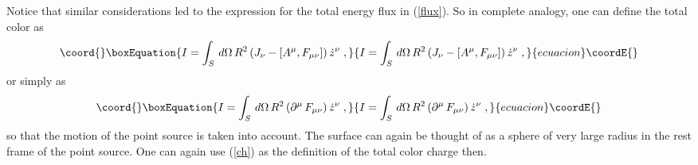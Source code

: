 \documentclass[a4paper,twocolumn,prd,showpacs,amsmath,amssymb]{revtex4}
\begin{document}
Notice that similar considerations led \cite{bar} to the expression for the
total energy flux \coordHE{} in (\ref{flux}). So in complete analogy, one can
define the total color as
\begin{equation}\coord{}\boxEquation{
I = \int_{S} \, d\Omega \, R^2 \, (J_{\nu} - [A^{\mu},F_{\mu\nu}]) \, \dot{z}^{\nu} \; ,
\label{stocol}
}{
I = \int_{S} \, d\Omega \, R^2 \, (J_{\nu} - [A^{\mu},F_{\mu\nu}]) \, \dot{z}^{\nu} \; ,
}{ecuacion}\coordE{}\end{equation}
or simply as
\begin{equation}\coord{}\boxEquation{
I = \int_{S} \, d\Omega \, R^2 \, (\partial^{\mu} \, F_{\mu\nu}) \, \dot{z}^{\nu} \; ,
\label{tocol}
}{
I = \int_{S} \, d\Omega \, R^2 \, (\partial^{\mu} \, F_{\mu\nu}) \, \dot{z}^{\nu} \; ,
}{ecuacion}\coordE{}\end{equation}
so that the motion of the point source is taken into account. The surface \coordHE{} can
again be thought of as a sphere \coordHE{} of very large radius \coordHE{} in the rest frame
of the point source. One can again use (\ref{ch}) as the definition of the total
color charge then.
\end{document}
